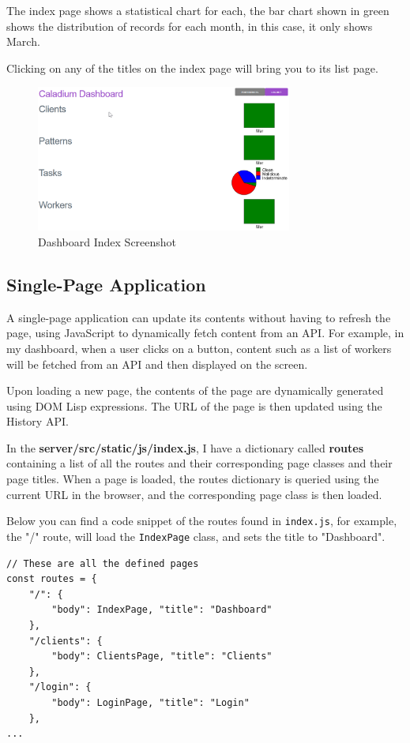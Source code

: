 The index page shows a statistical chart for each,
the bar chart shown in green shows the distribution of records for each month,
in this case, it only shows March.

Clicking on any of the titles on the index page will bring you to its list page.

\begin{figure}[h!]
    \centering
    \includegraphics[width=0.75\textwidth]{../docs/dashboard.png}
    \caption{Dashboard Index Screenshot}
    \label{image:dashboardScreenshot}
\end{figure}

\subsection{Single-Page Application}
A single-page application can update its contents
without having to refresh the page,
using JavaScript to dynamically fetch content from an API.
\cite{jadhav2015single}
For example, in my dashboard, when a user clicks on a button,
content such as a list of workers
will be fetched from an API and then displayed on the screen.

Upon loading a new page, the contents of the page are
dynamically generated using DOM Lisp expressions.
The URL of the page is then updated using the History API.

In the \textbf{server/src/static/js/index.js}, I have a dictionary called
\textbf{routes} containing a list of all
the routes and their corresponding
page classes and their page titles.
When a page is loaded,
the routes dictionary is queried using the current URL in the browser,
and the corresponding page class is then loaded.

Below you can find a code snippet of the routes found in \texttt{index.js},
for example, the "/" route, will load the \texttt{IndexPage} class,
and sets the title to "Dashboard". \\
\begin{lstlisting}
// These are all the defined pages
const routes = {
    "/": {
        "body": IndexPage, "title": "Dashboard"
    },
    "/clients": {
        "body": ClientsPage, "title": "Clients"
    },
    "/login": {
        "body": LoginPage, "title": "Login"
    },
...
\end{lstlisting}

